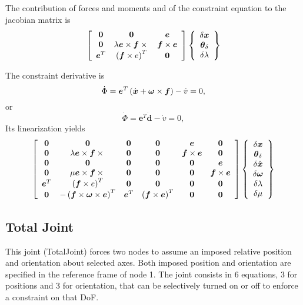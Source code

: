 \documentclass[10pt,dvips,fleqn,subeqn]{report}
\newcommand{\T}[1]{\boldsymbol{#1}}
\begin{document}
The contribution of forces and moments and of the constraint equation 
to the jacobian matrix is
\begin{equation}
	\sqbr{\matr{ccc}{
		\T{0} & \T{0} & \T{e} \\
		\T{0} & \lambda \T{e}\times\T{f}\times{} & \T{f}\times\T{e} \\
		\T{e}^T & \plbr{\T{f}\times{e}}^T & \T{0}
	}}\cubr{\cvvect{
		\delta\T{x} \\
		\T{\theta}_{\delta} \\
		\delta\lambda
	}}
\end{equation}

The constraint derivative is
\begin{equation}
	\dot{\Phi} = \T{e}^T \plbr{\dot{\T{x}} + \T{\omega}\times\T{f}} - \dot{v} = 0 ,
\end{equation}
or
\begin{equation}
	\dot{\Phi} = \T{e}^T \dot{\T{d}} - \dot{v} = 0 ,
\end{equation}
Its linearization yields
\begin{equation}
	\sqbr{\matr{cccccc}{
		\T{0} & \T{0} & \T{0} & \T{0} & \T{e} & \T{0} \\
		\T{0} & \lambda \T{e}\times\T{f}\times{} & 
			\T{0} & \T{0} & \T{f}\times\T{e} & \T{0} \\
		\T{0} & \T{0} & \T{0} & \T{0} & \T{0} & \T{e} \\
		\T{0} & \mu \T{e}\times\T{f}\times{} & 
			\T{0} & \T{0} & \T{0} & \T{f}\times\T{e} \\
		\T{e}^T & \plbr{\T{f}\times{e}}^T & 
			\T{0} & \T{0} & \T{0} & \T{0} \\
		\T{0} & - \plbr{\T{f}\times\T{\omega}\times\T{e}}^T &
			\T{e}^T & \plbr{\T{f}\times\T{e}}^T & \T{0} & \T{0}
	}}\cubr{\cvvect{
		\delta\T{x} \\
		\T{\theta}_{\delta} \\
		\delta\dot{\T{x}} \\
		\delta\T{\omega} \\
		\delta\lambda \\
		\delta\mu
	}}
\end{equation}













\subsection{Total Joint}
\label{sec:TotalJoint}
This joint (TotalJoint) forces two nodes to assume an imposed relative
position and orientation about selected axes.
Both imposed position and orientation are specified in the reference frame
of node 1.
The joint consists in 6 equations, 3 for positions and 3 for orientation, 
that can be selectively turned on or off to enforce a constraint on that DoF.
\end{document}
